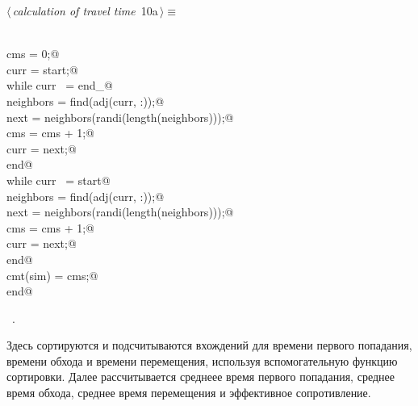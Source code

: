 \documentclass{article}
\begin{document}
\begin{flushleft} \small
\begin{minipage}{\linewidth}\label{scrap10}\raggedright\small
{} $\langle\,${\itshape calculation of travel time}\nobreak\ {\footnotesize {10a}}$\,\rangle\equiv$
\vspace{-1ex}
\begin{list}{}{} \item
\mbox{}\verb@@\\
\mbox{}\verb@        cms = 0;@\\
\mbox{}\verb@        curr = start;@\\
\mbox{}\verb@        while curr ~= end_@\\
\mbox{}\verb@            neighbors = find(adj(curr, :));@\\
\mbox{}\verb@            next = neighbors(randi(length(neighbors)));@\\
\mbox{}\verb@            cms = cms + 1;@\\
\mbox{}\verb@            curr = next;@\\
\mbox{}\verb@        end@\\
\mbox{}\verb@        while curr ~= start@\\
\mbox{}\verb@            neighbors = find(adj(curr, :));@\\
\mbox{}\verb@            next = neighbors(randi(length(neighbors)));@\\
\mbox{}\verb@            cms = cms + 1;@\\
\mbox{}\verb@            curr = next;@\\
\mbox{}\verb@        end@\\
\mbox{}\verb@        cmt(sim) = cms;@\\
\mbox{}\verb@    end@\\
\mbox{}\verb@@{\NWsep}
\end{list}
\vspace{-1.5ex}
\footnotesize
\begin{list}{}{\setlength{\itemsep}{-\parsep}\setlength{\itemindent}{-\leftmargin}}
\item \NWtxtMacroRefIn\ .

\item{}
\end{list}
\end{minipage}\vspace{4ex}
\end{flushleft}
Здесь сортируются и подсчитываются вхождений для времени первого попадания, времени обхода и времени перемещения, используя вспомогательную функцию сортировки. Далее рассчитывается среднеее время первого попадания, среднее время обхода, среднее время перемещения и эффективное сопротивление.
\end{document}
